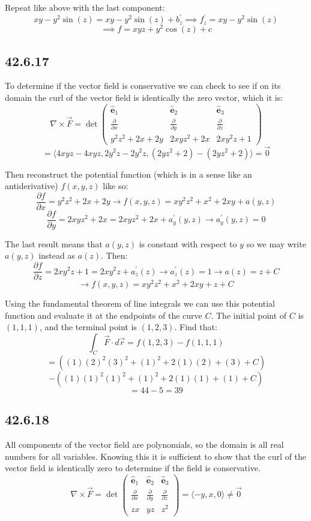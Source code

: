 \documentclass{article}
\begin{document}
Repeat like above with the last component:
$$xy-y^2\sin(z) = xy-y^2\sin(z)+ b^{\prime}_z \implies f^{\prime}_z = xy-y^2\sin(z)$$
$$\implies f = xyz + y^2\cos(z) + c$$

\subsection{42.6.17}

To determine if the vector field is conservative we can check to see if on its domain the curl of the vector field is identically the zero vector, which it is:
$$\nabla \times \vec{F} = \det \begin{pmatrix}
    \hat{\mathbf{e}}_1 & \hat{\mathbf{e}}_2 & \hat{\mathbf{e}}_3 \\
    \frac{\partial}{\partial x} & \frac{\partial}{\partial y} & \frac{\partial}{\partial z} \\
    y^2z^2+2x+2y & 2xyz^2 + 2x & 2xy^2z + 1
\end{pmatrix}$$
$$ = \langle 4xyz-4xyz, 2y^2z-2y^2z , (2yz^2+2)-(2yz^2+2) \rangle = \vec{0}$$

Then reconstruct the potential function (which is in a sense like an antiderivative) $f(x,y,z)$ like so:
$$\frac{\partial f}{\partial x} = y^2z^2+2x+2y \to f(x,y,z) = xy^2z^2+x^2+2xy + a(y,z)$$
$$\frac{\partial f}{\partial y} = 2xyz^2 + 2x = 2xyz^2+2x + a^{\prime}_y(y,z) \to a^{\prime}_y(y,z) = 0$$

The last result means that $a(y,z)$ is constant with respect to $y$ so we may write $a(y,z)$ instead as $a(z)$. Then:
$$\frac{\partial f}{\partial z} = 2xy^2z + 1 = 2xy^2z + a^{\prime}_z(z) \to a^{\prime}_z(z) = 1 \to a(z) = z+C$$
$$\to f(x,y,z) = xy^2z^2+x^2+2xy + z+C$$

Using the fundamental theorem of line integrals we can use this potential function and evaluate it at the endpoints of the curve $C$. The initial point of $C$ is $(1,1,1)$, and the terminal point is $(1,2,3)$. Find that:
$$\int_C \vec{F}\cdot d\vec{r} = f(1,2,3)-f(1,1,1)$$
$$ = \left((1)(2)^2(3)^2+(1)^2+2(1)(2) + (3) + C\right) $$
$$- \left((1)(1)^2(1)^2+(1)^2+2(1)(1) + (1) + C\right)$$
$$ = 44-5 = 39$$

\subsection{42.6.18}

All components of the vector field are polynomials, so the domain is all real numbers for all variables. Knowing this it is sufficient to show that the curl of the vector field is identically zero to determine if the field is conservative.
$$\nabla \times \vec{F} = \det \begin{pmatrix}
    \hat{\mathbf{e}}_1 & \hat{\mathbf{e}}_2 & \hat{\mathbf{e}}_3 \\
    \frac{\partial}{\partial x} & \frac{\partial}{\partial y} & \frac{\partial}{\partial z} \\
    zx & yz & z^2
\end{pmatrix} = \langle -y, x ,0 \rangle \neq \vec{0}$$
\end{document}

